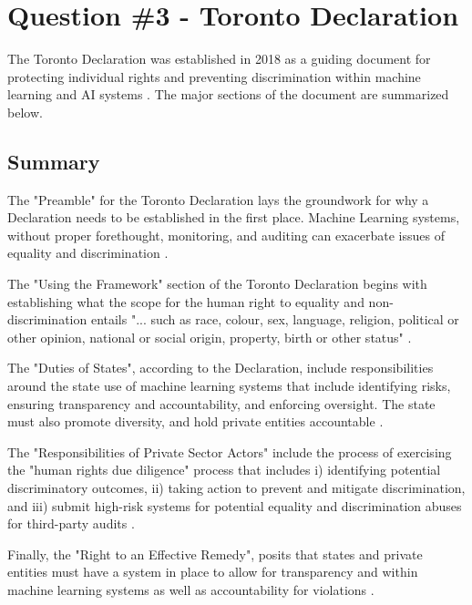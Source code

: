 \documentclass[
	letterpaper, %
]{jdf}
\begin{document}
\section{Question \#3 - Toronto Declaration}
The Toronto Declaration was established in 2018 as a guiding document for protecting individual rights and preventing discrimination within machine learning and AI systems \citep{Toronto}. The major sections of the document are summarized below.
\subsection{Summary}
The "Preamble" for the Toronto Declaration lays the groundwork for why a Declaration needs to be established in the first place. Machine Learning systems, without proper forethought, monitoring, and auditing can exacerbate issues of equality and discrimination \citep{Toronto}.

The "Using the Framework" section of the Toronto Declaration begins with establishing what the scope for the human right to equality and non-discrimination entails "... such as race, colour, sex, language, religion, political or other opinion, national or social origin, property, birth or other status" \citep{Toronto}.

The "Duties of States", according to the Declaration, include responsibilities around the state use of machine learning systems that include identifying risks, ensuring transparency and accountability, and enforcing oversight. The state must also promote diversity, and hold private entities accountable \citep{Toronto}.

The "Responsibilities of Private Sector Actors" include the process of exercising the "human rights due diligence" process that includes i) identifying potential discriminatory outcomes, ii) taking action to prevent and mitigate discrimination, and iii) submit high-risk systems for potential equality and discrimination abuses for third-party audits \citep{Toronto}.

Finally, the "Right to an Effective Remedy", posits that states and private entities must have a system in place to allow for transparency and within machine learning systems as well as accountability for violations \citep{Toronto}.
\end{document}
